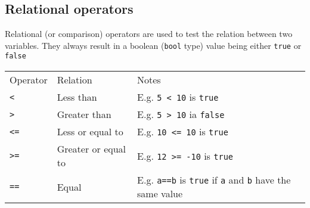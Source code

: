 \documentclass[11pt]{article}
\begin{document}
\subsection{Relational operators}
\label{sec:orga94d1d8}
Relational (or comparison) operators are used to test the relation between two variables. They always result in a boolean (\texttt{bool} type) value being either \texttt{true} or \texttt{false}
\begin{center}
\begin{tabular}{lll}
Operator & Relation & Notes\\[0pt]
\texttt{<} & Less than & E.g. \texttt{5 < 10} is \texttt{true}\\[0pt]
\texttt{>} & Greater than & E.g. \texttt{5 > 10} ia \texttt{false}\\[0pt]
\texttt{<=} & Less or equal to & E.g. \texttt{10 <= 10} is \texttt{true}\\[0pt]
\texttt{>=} & Greater or equal to & E.g. \texttt{12 >= -10} is \texttt{true}\\[0pt]
\texttt{==} & Equal & E.g. \texttt{a==b} is \texttt{true} if \texttt{a} and \texttt{b} have the same value\\[0pt]
\hline
\end{tabular}
\end{center}
\end{document}

